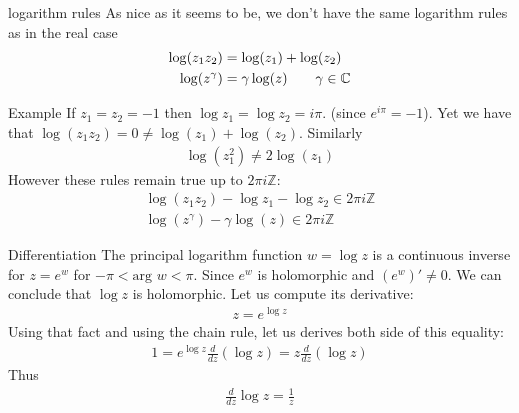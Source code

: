 \begin{parag}{logarithm rules}
    As nice as it seems to be, we don't have the same logarithm rules as in the real case
\begin{align*}
	\log\left(z_1z_2\right) &= \log\left(z_1\right) + \log\left(z_2\right)\\
	\log\left(z^{\gamma}\right) &= \gamma\log \left(z\right) \mathspace \mathspace \gamma \in \mathbb{C}
\end{align*}
\begin{subparag}{Example}
    If $z_1 =  z_2 =  -1$ then $\log z_1 =  \log z_2 =  i\pi$. (since $e^{i\pi}= -1$). Yet we have that $\log\left(z_1z_2\right) =  0 \neq\log\left(z_1\right) + \log \left(z_2\right)$. Similarly 
	\begin{align*} 
		\log \left(z_1^2\right) \neq 2\log\left(z_1\right) 
	\end{align*}
		However these rules remain true up to $2\pi i\mathbb{Z}$:
		\begin{align*} 
			\log\left(z_1z_2\right) - \log z_1 - \log z_2 \in 2\pi i \mathbb{Z} \\
			\log\left(z^{\gamma}\right) - \gamma \log \left(z\right) \in 2\pi i \mathbb{Z}
		\end{align*}
\end{subparag}

\begin{subparag}{Differentiation}
	The principal logarithm function $w =  \log z$ is a continuous inverse for $z = e^{w}$  for $-\pi < \text{arg }w < \pi$. Since $e^{w}$ is holomorphic and $\left(e^{w}\right)' \neq 0$. We can conclude that $\log z$ is holomorphic. Let us compute its derivative:
	\begin{align*} 
		z = e^{\log z}
	\end{align*}
	Using that fact and using the chain rule, let us derives both side of this equality:
	\begin{align*} 
		1 = e^{\log z} \frac{d}{dz} \left(\log z\right) =  z \frac{d}{dz} \left(\log z\right)
	\end{align*}
	Thus
	\begin{align*} 
		\frac{d}{dz} \log z =  \frac{1}{z}
	\end{align*}
    
\end{subparag}
\end{parag}

